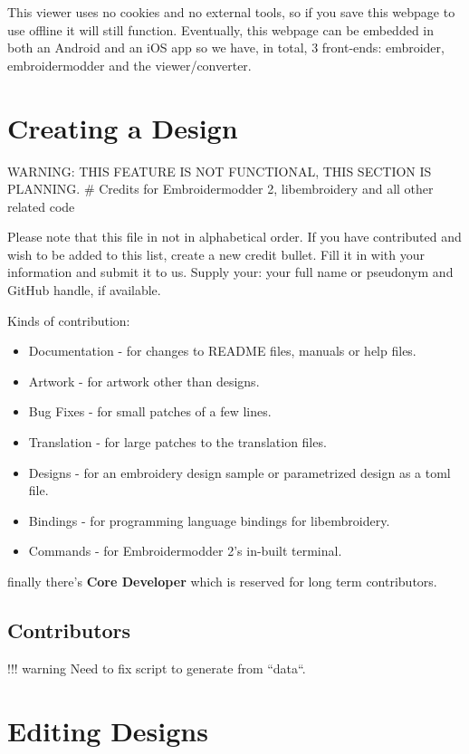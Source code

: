 This viewer uses no cookies and no external tools, so if you save this webpage to use offline it will still function.
Eventually, this webpage can be embedded in both an Android and an iOS app so we have, in total, 3 front-ends: embroider,
embroidermodder and the viewer/converter.

\section{Creating a Design}

WARNING: THIS FEATURE IS NOT FUNCTIONAL, THIS SECTION IS PLANNING.
# Credits for Embroidermodder 2, libembroidery and all other related code

Please note that this file in not in alphabetical order. If you have
contributed and wish to be added to this list, create a new credit
bullet. Fill it in with your information and submit it to us. Supply
your: your full name or pseudonym and GitHub handle, if available.

Kinds of contribution:

\begin{itemize}
\item Documentation - for changes to README files, manuals or help files.
\item Artwork - for artwork other than designs.
\item Bug Fixes - for small patches of a few lines.
\item Translation - for large patches to the translation files.
\item Designs - for an embroidery design sample or parametrized design as a toml file.
\item Bindings - for programming language bindings for libembroidery.
\item Commands - for Embroidermodder 2's in-built terminal.
\end{itemize}

finally there's \textbf{Core Developer} which is reserved for long term
contributors.

\subsection{Contributors}

!!! warning
    Need to fix script to generate from ``data``.

\section{Editing Designs}

